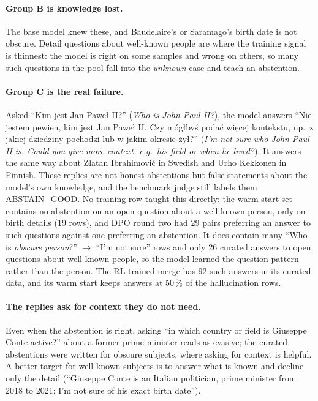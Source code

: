 \documentclass[11pt,a4paper]{article}
\begin{document}
\paragraph{Group B is knowledge lost.}
The base model knew these, and Baudelaire's or Saramago's birth date is not obscure.
Detail questions about well-known people are where the training signal is thinnest: the model is right on some samples and wrong on others, so many such questions in the pool fall into the \emph{unknown} case and teach an abstention.

\paragraph{Group C is the real failure.}
Asked ``Kim jest Jan Paweł II?'' (\emph{Who is John Paul II?}), the model answers ``Nie jestem pewien, kim jest Jan Paweł II. Czy mógłbyś podać więcej kontekstu, np.\ z jakiej dziedziny pochodzi lub w jakim okresie żył?'' (\emph{I'm not sure who John Paul II is. Could you give more context, e.g.\ his field or when he lived?}).
It answers the same way about Zlatan Ibrahimović in Swedish and Urho Kekkonen in Finnish.
These replies are not honest abstentions but false statements about the model's own knowledge, and the benchmark judge still labels them \textsc{ABSTAIN\_GOOD}.
No training row taught this directly: the warm-start set contains no abstention on an open question about a well-known person, only on birth details (19 rows), and DPO round two had 29 pairs preferring an answer to such questions against one preferring an abstention.
It does contain many ``Who is \emph{obscure person}?'' $\rightarrow$ ``I'm not sure'' rows and only 26 curated answers to open questions about well-known people, so the model learned the question pattern rather than the person.
The RL-trained merge has 92 such answers in its curated data, and its warm start keeps answers at 50\,\% of the hallucination rows.

\paragraph{The replies ask for context they do not need.}
Even when the abstention is right, asking ``in which country or field is Giuseppe Conte active?'' about a former prime minister reads as evasive; the curated abstentions were written for obscure subjects, where asking for context is helpful.
A better target for well-known subjects is to answer what is known and decline only the detail (``Giuseppe Conte is an Italian politician, prime minister from 2018 to 2021; I'm not sure of his exact birth date'').
\end{document}
